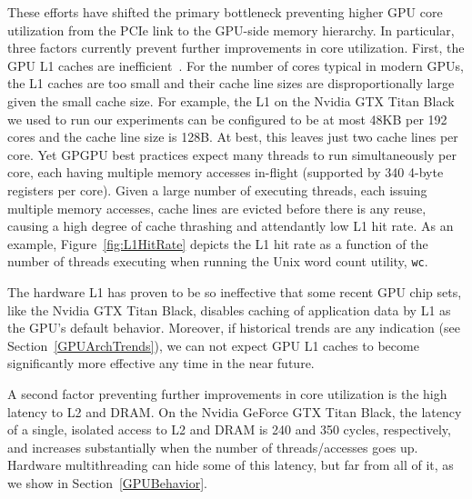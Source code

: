 These efforts have shifted the primary bottleneck preventing higher GPU core utilization from the PCIe link to the GPU-side memory hierarchy.
In particular, three factors currently prevent further improvements in core utilization.
First, the GPU L1 caches are inefficient~\cite{jia2012characterizing}. %
For the number of cores typical in modern GPUs, the L1 caches are too small and their cache line sizes are disproportionally large given the small cache size.
For example,  the L1 on the Nvidia GTX Titan Black we used to run our experiments can be configured to be at most 48KB per 192 cores and the cache line size is 128B.
At best, this leaves just two cache lines per core. 
Yet GPGPU best practices expect many threads to run simultaneously per core, each having multiple memory accesses in-flight (supported by 340 4-byte registers per core).
Given a large number of executing threads, each issuing multiple memory accesses, cache lines are evicted before there is any reuse, causing a high degree of cache thrashing and attendantly low L1 hit rate.
As an example, Figure~\ref{fig:L1HitRate} depicts the L1 hit rate as a function of the number of
threads executing when running the Unix word count utility, \texttt{wc}.

The hardware L1 has proven to be so ineffective that some recent GPU chip sets, like the Nvidia GTX Titan Black,
disables caching of application data by L1 as the GPU's default behavior.
Moreover, if historical trends are any indication (see Section~\ref{GPUArchTrends}), we can not expect GPU L1
caches to become significantly more effective any time in the near future.

A second factor preventing further improvements in core utilization is the high latency to L2 and  DRAM. 
On the Nvidia GeForce GTX Titan Black, the latency of a single, isolated access to L2 and DRAM is 240 and 350 cycles, respectively,
and increases substantially when the number of threads/accesses goes up.
Hardware multithreading can hide some of this latency, but far from all of it, as we show in Section~\ref{GPUBehavior}.

